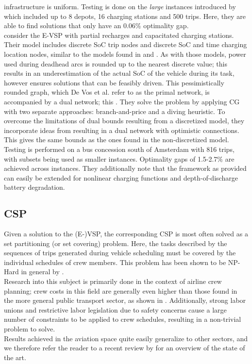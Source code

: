 \documentclass[]{article}
\begin{document}
infrastructure is uniform. Testing is done on the \textit{large}
instances introduced by \citet{Wen2016} which included up to 8
depots, 16 charging stations and 500 trips. Here, they are able to find
solutions that only have an 0.06\% optimality gap. \\
 consider the E-VSP with partial recharges and capacitated charging stations. Their model includes discrete SoC trip nodes and discrete SoC and time charging location nodes, similar to the models found in \citet{vanKootenNiekerk2017} and \citet{Zhang2021}. As with those models, power used during deadhead arcs is rounded up to the nearest discrete value; this results in an underestimation of the actual SoC of the vehicle during its task, however ensures solutions that can be feasibly driven. This pessimistically rounded graph, which De Vos et al. refer to as the primal network, is accompanied by a dual network; this . They solve the problem by applying CG with two separate approaches:
branch-and-price and a diving heuristic. To overcome the limitations of dual bounds resulting from a discretized model, they incorporate ideas from \citet{Boland2017} resulting in a dual network with optimistic connections. This gives the same bounds as the ones found in the
non-discretized model. Testing is performed on a bus concession south of
Amsterdam with 816 trips, with subsets being used as smaller instances.
Optimality gaps of 1.5-2.7\% are achieved across instances. They additionally
note that the framework as provided can easily be extended for nonlinear
charging functions and depth-of-discharge battery degradation. 

\subsection{CSP}
Given a solution to the (E-)VSP, the corresponding CSP is most often solved as a set partitioning (or set covering) problem. Here, the tasks described by the sequences of trips generated during vehicle scheduling must be covered by the individual schedules of crew members. This problem has been shown to be NP-Hard in general by \citet{Fischetti1989}.\\
Research into this subject is primarily done in the context of airline crew planning; crew costs in this field are generally even higher than those found in the more general public transport sector, as shown in \citet{Barnhart2003}. Additionally, strong labor unions and restrictive labor legislation due to safety concerns cause a large number of constraints to be applied to crew schedules, resulting in a non-trivial problem to solve. \\
Results achieved in the aviation space quite easily generalize to other sectors, and we therefore refer the reader to a recent review by \citet{Deveci2018} for an overview of the state of the art. 
\end{document}
